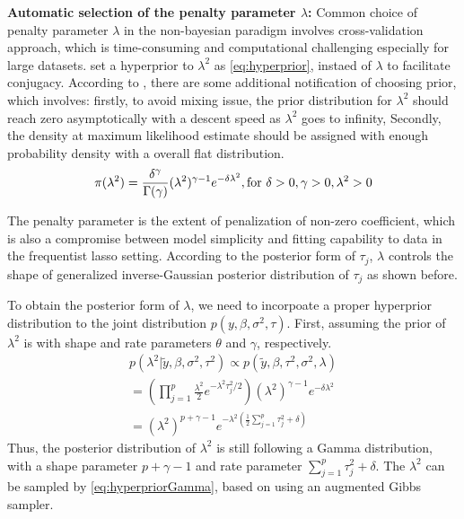 \textbf{Automatic selection of the penalty parameter $\lambda$:}
Common choice of penalty parameter $\lambda$ in the non-bayesian paradigm involves cross-validation approach, which is time-consuming and computational challenging especially for large datasets.
\cite{park_casella_2008} set a hyperprior to $\lambda^2$ as \ref{eq:hyperprior}, instaed of $\lambda$ to facilitate conjugacy.
According to \cite{park_casella_2008}, there are some additional notification of choosing prior, which involves: firstly, to avoid mixing issue, the prior distribution for $\lambda^2$ should reach zero asymptotically with a descent speed as $\lambda^2 $ goes to infinity, Secondly, the density at maximum likelihood estimate should be assigned with enough probability density with a overall flat distribution.
\begin{equation}
	\label{eq:hyperprior}
	\pi(\lambda^2) = \frac{\delta^\gamma}{\Gamma(\gamma)}(\lambda^2)^{\gamma-1}e^{-\delta\lambda^2}, \textnormal{for } \delta>0, \gamma>0, \lambda^2>0
\end{equation}

 The penalty parameter is the extent of penalization of non-zero coefficient, which is also a compromise between model simplicity and fitting capability to data in the frequentist lasso setting. According to the posterior form of $\tau_j$, $\lambda$ controls the shape of generalized inverse-Gaussian posterior distribution of $\tau_j$ as shown before.

To obtain the posterior form of $\lambda$, we need to incorpoate a proper hyperprior distribution to the joint distribution $p(y,\beta,\sigma^2,\tau)$. First, assuming the prior of $\lambda^2$ is with shape and rate parameters $\theta$ and $\gamma$, respectively.
\begin{equation}
	\label{eq:hyperpriorGamma}
	\begin{multlined}
	p(\lambda^2|\tilde{y},\beta,\sigma^2,\tau^2) \propto  	p(\tilde{y},\beta,\tau^2,\sigma^2,\lambda)  \\
	= (\prod_{j=1}^p \frac{\lambda^2}{2} e^{-\lambda^2\tau_j^2/2})(\lambda^2)^{\gamma-1}e^{-\delta\lambda^2}\\
	= (\lambda^2)^{p+\gamma-1}e^{-\lambda^2(\frac{1}{2}\sum_{j=1}^p \tau_j^2+\delta)}
\end{multlined}
\end{equation} 
Thus, the posterior distribution of $\lambda^2$ is still following a Gamma distribution, with a shape parameter $p+\gamma-1$ and rate parameter $\sum_{j=1}^p \tau_j^2+\delta$. The $\lambda^2$ can be sampled by \ref{eq:hyperpriorGamma}, based on using an augmented Gibbs sampler.

